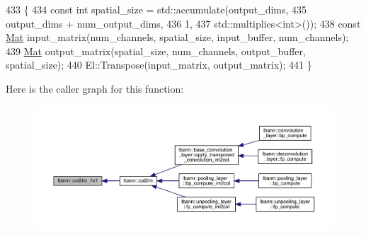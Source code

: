 \begin{DoxyCode}
433                                          \{
434   \textcolor{keyword}{const} \textcolor{keywordtype}{int} spatial\_size = std::accumulate(output\_dims,
435                                            output\_dims + num\_output\_dims,
436                                            1,
437                                            std::multiplies<int>());
438   \textcolor{keyword}{const} \hyperlink{base_8hpp_a68f11fdc31b62516cb310831bbe54d73}{Mat} input\_matrix(num\_channels, spatial\_size, input\_buffer, num\_channels);
439   \hyperlink{base_8hpp_a68f11fdc31b62516cb310831bbe54d73}{Mat} output\_matrix(spatial\_size, num\_channels, output\_buffer, spatial\_size);
440   El::Transpose(input\_matrix, output\_matrix);
441 \}
\end{DoxyCode}
Here is the caller graph for this function\+:\nopagebreak
\begin{figure}[H]
\begin{center}
\leavevmode
\includegraphics[width=350pt]{namespacelbann_ab4fccda3dc4c2c293d643815dfefe22a_icgraph}
\end{center}
\end{figure}
\mbox{\label{namespacelbann_a1953674a43b284f0abb5c5e4db94b2b9}} 

